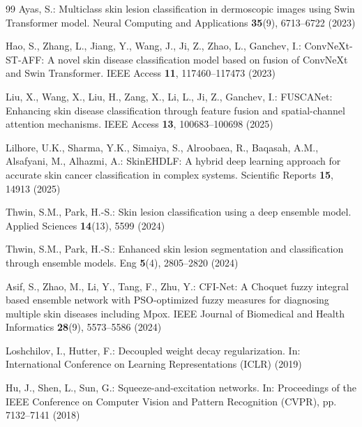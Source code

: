 \documentclass[VANCOUVER,twocolumn]{USG}
\begin{document}
\begin{thebibliography}{99}
Ayas, S.: Multiclass skin lesion classification in dermoscopic images using Swin Transformer
model. Neural Computing and Applications \textbf{35}(9), 6713--6722 (2023)

Hao, S., Zhang, L., Jiang, Y., Wang, J., Ji, Z., Zhao, L., Ganchev, I.: ConvNeXt-ST-AFF: A
novel skin disease classification model based on fusion of ConvNeXt and Swin Transformer.
IEEE Access \textbf{11}, 117460--117473 (2023)

Liu, X., Wang, X., Liu, H., Zang, X., Li, L., Ji, Z., Ganchev, I.: FUSCANet: Enhancing skin
disease classification through feature fusion and spatial-channel attention mechanisms. IEEE
Access \textbf{13}, 100683--100698 (2025)

Lilhore, U.K., Sharma, Y.K., Simaiya, S., Alroobaea, R., Baqasah, A.M., Alsafyani, M.,
Alhazmi, A.: SkinEHDLF: A hybrid deep learning approach for accurate skin cancer
classification in complex systems. Scientific Reports \textbf{15}, 14913 (2025)

Thwin, S.M., Park, H.-S.: Skin lesion classification using a deep ensemble model. Applied
Sciences \textbf{14}(13), 5599 (2024)

Thwin, S.M., Park, H.-S.: Enhanced skin lesion segmentation and classification through
ensemble models. Eng \textbf{5}(4), 2805--2820 (2024)

Asif, S., Zhao, M., Li, Y., Tang, F., Zhu, Y.: CFI-Net: A Choquet fuzzy integral based
ensemble network with PSO-optimized fuzzy measures for diagnosing multiple skin diseases
including Mpox. IEEE Journal of Biomedical and Health Informatics \textbf{28}(9), 5573--5586
(2024)

Loshchilov, I., Hutter, F.: Decoupled weight decay regularization. In: International Conference
on Learning Representations (ICLR) (2019)

Hu, J., Shen, L., Sun, G.: Squeeze-and-excitation networks. In: Proceedings of the IEEE
Conference on Computer Vision and Pattern Recognition (CVPR), pp. 7132--7141 (2018)


\end{thebibliography}
\end{document}
